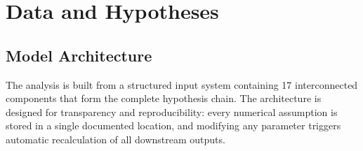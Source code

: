 
\section{Data and Hypotheses}


\subsection{Model Architecture}
\label{app:model_arch}

The analysis is built from a structured input system containing 17 interconnected
components that form the complete hypothesis chain. The architecture is designed for
transparency and reproducibility: every numerical assumption is stored in a single
documented location, and modifying any parameter triggers automatic recalculation of
all downstream outputs.

